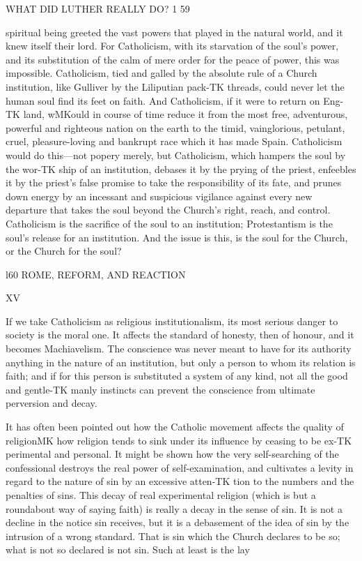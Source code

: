 \documentclass[12pt,a5paper,oneside]{book}
\begin{document}
{WHAT DID LUTHER REALLY DO? 1 59 

spiritual being greeted the vast powers that played in 
the natural world, and it knew itself their lord. For 
Catholicism, with its starvation of the soul's power, 
and its substitution of the calm of mere order for the 
peace of power, this was impossible. Catholicism, 
tied and galled by the absolute rule of a Church 
institution, like Gulliver by the Liliputian pack-TK
threads, could never let the human soul find its feet on 
faith. And Catholicism, if it were to return on Eng-TK
land, wMKould in course of time reduce it from the most 
free, adventurous, powerful and righteous nation on 
the earth to the timid, vainglorious, petulant, cruel, 
pleasure-loving and bankrupt race which it has made 
Spain. Catholicism would do this---not popery merely, 
but Catholicism, which hampers the soul by the wor-TK
ship of an institution, debases it by the prying of the 
priest, enfeebles it by the priest's false promise to take 
the responsibility of its fate, and prunes down energy 
by an incessant and suspicious vigilance against every 
new departure that takes the soul beyond the Church's 
right, reach, and control. Catholicism is the sacrifice 
of the soul to an institution; Protestantism is the 
soul's release for an institution. And the issue is 
this, is the soul for the Church, or the Church for the 
soul? 



l60 ROME, REFORM, AND REACTION 

XV 

If we take Catholicism as religious institutionalism, 
its most serious danger to society is the moral one. It 
affects the standard of honesty, then of honour, and it 
becomes Machiavelism. The conscience was never 
meant to have for its authority anything in the nature 
of an institution, but only a person to whom its 
relation is faith; and if for this person is substituted 
a system of any kind, not all the good and gentle-TK
manly instincts can prevent the conscience from 
ultimate perversion and decay. 

It has often been pointed out how the Catholic 
movement affects the quality of religionMK how religion 
tends to sink under its influence by ceasing to be ex-TK
perimental and personal. It might be shown how the 
very self-searching of the confessional destroys the 
real power of self-examination, and cultivates a levity 
in regard to the nature of sin by an excessive atten-TK
tion to the numbers and the penalties of sins. This 
decay of real experimental religion (which is but a 
roundabout way of saying faith) is really a decay in 
the sense of sin. It is not a decline in the notice 
sin receives, but it is a debasement of the idea of 
sin by the intrusion of a wrong standard. That is 
sin which the Church declares to be so; what is 
not so declared is not sin. Such at least is the lay 



}
\end{document}
